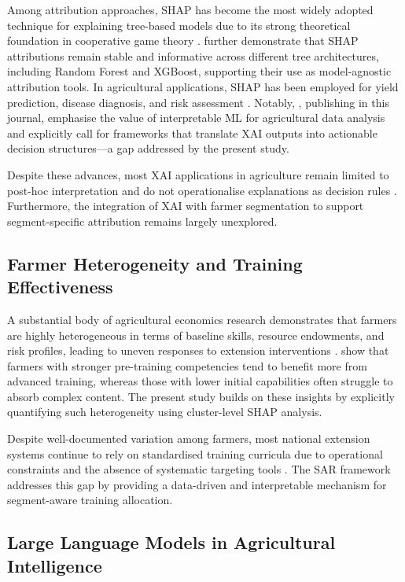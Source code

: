 \documentclass[3p,twocolumn,authoryear]{elsarticle}
\begin{document}
Among attribution approaches, SHAP has become the most widely adopted
technique for explaining tree-based models due to its strong theoretical
foundation in cooperative game theory \citep{lundberg2017}.
\citet{lundberg2020} further demonstrate that SHAP attributions remain
stable and informative across different tree architectures, including
Random Forest and XGBoost, supporting their use as model-agnostic
attribution tools.
In agricultural applications, SHAP has been employed for yield
prediction, disease diagnosis, and risk assessment
\citep{ghosal2018,ryo2022}.
Notably, \citet{ryo2022}, publishing in this journal, emphasise the value
of interpretable ML for agricultural data analysis and explicitly call
for frameworks that translate XAI outputs into actionable decision
structures—a gap addressed by the present study.

Despite these advances, most XAI applications in agriculture remain
limited to post-hoc interpretation and do not operationalise
explanations as decision rules
\citep{linardatos2021,arrieta2020}.
Furthermore, the integration of XAI with farmer segmentation to support
segment-specific attribution remains largely unexplored.

\subsection{Farmer Heterogeneity and Training Effectiveness}

A substantial body of agricultural economics research demonstrates that
farmers are highly heterogeneous in terms of baseline skills, resource
endowments, and risk profiles, leading to uneven responses to extension
interventions \citep{feder1985,anderson2004}.
\citet{davis2012} show that farmers with stronger pre-training
competencies tend to benefit more from advanced training, whereas those
with lower initial capabilities often struggle to absorb complex
content.
The present study builds on these insights by explicitly quantifying such
heterogeneity using cluster-level SHAP analysis.

Despite well-documented variation among farmers, most national extension
systems continue to rely on standardised training curricula due to
operational constraints and the absence of systematic targeting tools
\citep{anderson2004}.
The SAR framework addresses this gap by providing a data-driven and
interpretable mechanism for segment-aware training allocation.

\subsection{Large Language Models in Agricultural Intelligence}
\end{document}
